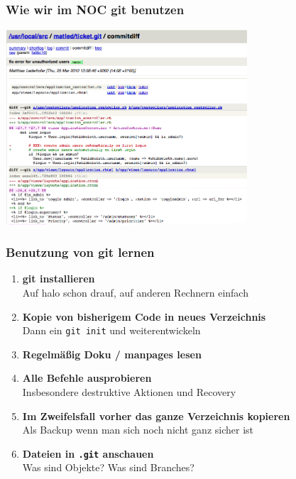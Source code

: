 \begin{frame}
  \frametitle{Wie wir im NOC git benutzen}
  \vspace{-0.3cm}
  \begin{center}
    \includegraphics[width=9cm]{img/git_diff_halo.png}
  \end{center}
\end{frame}

\begin{frame}
  \frametitle{Benutzung von git lernen}
  \begin{enumerate}
    \item {\bf git installieren} \\ Auf halo schon drauf, auf anderen Rechnern einfach
    \item {\bf Kopie von bisherigem Code in neues Verzeichnis} \\ Dann ein {\tt git init} und weiterentwickeln
    \item {\bf Regelmäßig Doku / manpages lesen}
    \item {\bf Alle Befehle ausprobieren} \\ Insbesondere destruktive Aktionen und Recovery
    \item {\bf Im Zweifelsfall vorher das ganze Verzeichnis kopieren} \\ Als Backup wenn man sich noch nicht ganz sicher ist
    \item {\bf Dateien in {\tt .git} anschauen} \\ Was sind Objekte? Was sind Branches?
  \end{enumerate}
\end{frame}

